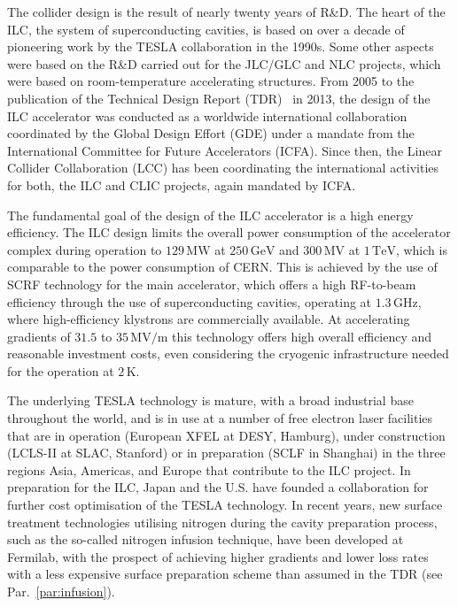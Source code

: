 The collider design is the result of nearly twenty years of R\&D. 
The heart of the ILC, the system of superconducting cavities, is based on over a decade of pioneering work by the TESLA collaboration in the 1990s. 
Some other aspects were based on the R\&D carried out for the JLC/GLC and NLC projects, which were based on room-temperature accelerating structures. 
From 2005 to the publication of the Technical Design Report (TDR)~\cite{Adolphsen:2013kya} in 2013, the design of the ILC accelerator was conducted as a worldwide international collaboration coordinated by the Global Design Effort (GDE) under a mandate from the International Committee for Future Accelerators (ICFA).
Since then, the Linear Collider Collaboration (LCC) has been coordinating the international activities for both, the ILC and CLIC projects, again mandated by ICFA.

The fundamental goal of the design of the ILC accelerator is a high energy efficiency.  The ILC design
 limits the overall power consumption of the accelerator complex during operation to $129\,{\mathrm{MW}}$ at  $250\,{\mathrm{GeV}}$ and $300\,{\mathrm{MV}}$ at  $1\,{\mathrm{TeV}}$, which is comparable to the power consumption of CERN.
This is achieved by the use of SCRF technology for the main accelerator, which offers a high RF-to-beam efficiency through the use of superconducting cavities, operating at $1.3\,{\mathrm{GHz}}$, where high-efficiency klystrons are commercially available.
At accelerating gradients of $31.5$ to $35\,{\mathrm{MV/m}}$ this technology offers high overall efficiency and reasonable investment costs, even considering the cryogenic infrastructure needed for the operation at $2\,{\mathrm{K}}$.

The underlying TESLA technology is mature, with a broad industrial base throughout the world, and is in use at a number of free electron laser facilities that are in operation (European XFEL at DESY, Hamburg), under construction (LCLS-II at SLAC, Stanford) or in preparation (SCLF in Shanghai) in the three regions Asia, Americas, and Europe that contribute to the ILC project.
In preparation for the ILC, Japan and the U.S. have founded a collaboration for further cost optimisation of the TESLA technology.
In recent years, new surface treatment technologies utilising nitrogen during the cavity preparation process, such as the so-called   nitrogen infusion technique, have been developed at Fermilab, with the prospect of  achieving higher gradients and lower loss rates with a less expensive surface preparation scheme than assumed in the TDR (see Par.~\ref{par:infusion}).

